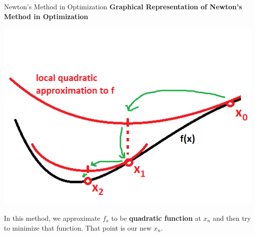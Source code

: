 \documentclass[10pt]{beamer}
\begin{document}
\begin{frame}[fragile]{Newton's Method in Optimization}
 \textbf{Graphical Representation of Newton's Method in Optimization}
  \begin{center}
    \graphicspath{ {./images/} }
    \includegraphics [scale=0.45] {NR-Opt}
\end{center}
In this method, we approximate $f_x$ to be \textbf{quadratic function} at $x_n$ and then try to minimize that function. That point is our new $x_n$.
\end{frame}
\end{document}
